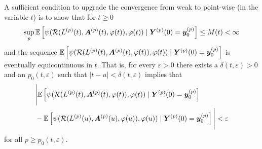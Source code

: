 A sufficient condition to upgrade the convergence from weak to point-wise (in the variable \(t\)) is to show that for \(t\geq 0\) 
\[\sup_{p}\mathbb E\left[\psi( \mathcal R(L^{(p)}(t),\boldsymbol A^{(p)}(t),\varphi(t)),\varphi(t) )  \mid \boldsymbol Y^{(p)}(0)=\boldsymbol y_0^{(p)} \right]  \leq M(t)<\infty\]
and the sequence \(\mathbb E\left[\psi( \mathcal R(L^{(p)}(t),\boldsymbol A^{(p)}(t),\varphi(t)),\varphi(t) )   \mid \boldsymbol Y^{(p)}(0)=\boldsymbol y_0^{(p)} \right]  \) is eventually equicontinuous in \(t\). That is, for every \(\varepsilon>0\) there exists a \(\delta(t,\varepsilon)>0\) and an \(p_0(t,\varepsilon)\) such that \(|t-u|<\delta(t,\varepsilon)\) implies that 
\begin{align}
	&\nonumber \Bigg|\mathbb E\left[\psi( \mathcal R(L^{(p)}(t),\boldsymbol A^{(p)}(t),\varphi(t)),\varphi(t) )   \mid \boldsymbol Y^{(p)}(0)=\boldsymbol y_0^{(p)} \right] 
	\\&{}-\mathbb E\left[\psi( \mathcal R(L^{(p)}(u),\boldsymbol A^{(p)}(u),\varphi(u)),\varphi(u) )   \mid \boldsymbol Y^{(p)}(0)=\boldsymbol y_0^{(p)}\right] \Bigg| \nonumber 
	<\varepsilon
\end{align}
for all \(p\geq p_0(t,\varepsilon)\). 

